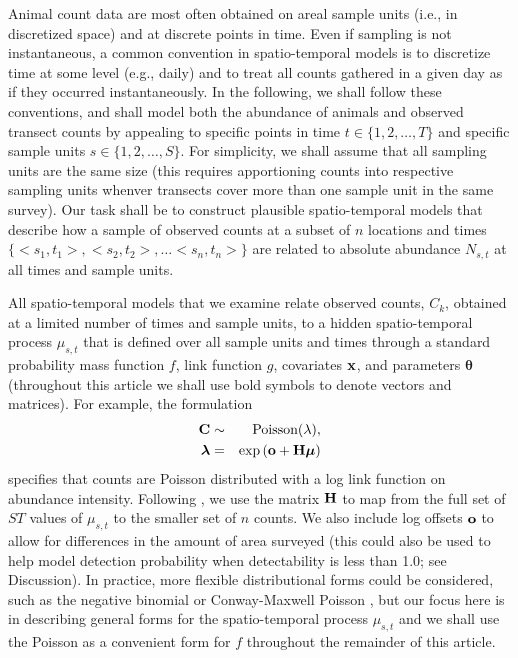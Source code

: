 \documentclass[times,mee,doublespace,]{besauth2}
\begin{document}
Animal count data are most often obtained on areal sample units (i.e., in discretized space) and at discrete points in time.  Even if sampling is not instantaneous, a common convention in spatio-temporal models is to discretize time at some level (e.g., daily) and to treat all counts gathered in a given day as if they occurred instantaneously. In the following, we shall follow these conventions, and shall model both the abundance of animals and observed transect counts by appealing to specific points in time $t \in  \{ 1,2,\hdots,T \} $ and specific sample units $s \in \{ 1,2,\hdots,S \}$.  For simplicity, we shall assume that all sampling units are the same size (this requires apportioning counts into respective sampling units whenver transects cover more than one sample unit in the same survey).  Our task shall be to construct plausible spatio-temporal models that describe how a sample of observed counts at a subset of $n$ locations and times $\{ <s_1,t_1>,<s_2,t_2>,\hdots <s_n,t_n> \}$ are related to absolute abundance $N_{s,t}$ at all times and sample units.

All spatio-temporal models that we examine relate observed counts, $C_k$, obtained at a limited number of times and sample units, to a hidden spatio-temporal process $\mu_{s,t}$ that is defined over all sample units and times through a standard probability mass function $f$, link function $g$, covariates ${\bf x}$, and parameters $\boldsymbol{\theta}$ (throughout this article we shall use bold symbols to denote vectors and matrices).  For example, the formulation
\begin{eqnarray}
  {\bf C} & \sim & \textrm{Poisson}({\bf \lambda}), \nonumber \\
  \boldsymbol{\lambda} & = & \exp \left( {\bf o} + {\bf H}\boldsymbol{\mu} \right) \label{eq:basic-mod}
\end{eqnarray}
specifies that counts are Poisson distributed with a log link function on abundance intensity. Following \citet{WikleHooten2010}, we use the matrix ${\bf H}$ to map from the full set of $ST$ values of $\mu_{s,t}$ to the smaller set of $n$ counts. We also include log offsets ${\bf o}$ to allow for differences in the amount of area surveyed (this could also be used to help model detection probability when detectability is less than 1.0; see Discussion).  In practice, more flexible distributional forms could be considered, such as the negative binomial or Conway-Maxwell Poisson \citep{WuEtAl2013}, but our focus here is in describing general forms for the spatio-temporal process $\mu_{s,t}$ and we shall use the Poisson as a convenient form for $f$ throughout the remainder of this article.
\end{document}
